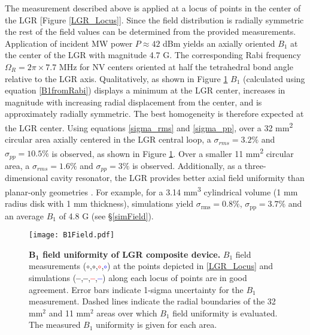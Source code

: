 The measurement described above is applied at a locus of points in the center of the LGR [Figure \ref{LGR_Locus}]. Since the field distribution is radially symmetric the rest of the field values can be determined from the provided measurements. Application of incident MW power $P \approx 42$ dBm yields an axially oriented $B_1$ at the center of the LGR with magnitude 4.7 G. The corresponding Rabi frequency $\Omega_R = 2\pi \times 7.7$ MHz for NV centers oriented at half the tetrahedral bond angle relative to the LGR axis. Qualitatively, as shown in Figure \ref{LGR_Field_Image} $B_1$ (calculated using equation \ref{B1fromRabi}) displays a minimum at the LGR center, increases in magnitude with increasing radial displacement from the center, and is approximately radially symmetric. The best homogeneity is therefore expected at the LGR center. Using equations \ref{sigma_rms} and \ref{sigma_pp}, over a 32 mm\textsuperscript{2} circular area axially centered in the LGR
central loop, a $\sigma_{rms} = 3.2\%$ and $\sigma_{pp} = 10.5\%$ is observed, as shown in Figure \ref{LGR_Field_Image}. Over a smaller 11 mm\textsuperscript{2} circular area, a $\sigma_{rms} = 1.6\%$ and $\sigma_{pp} = 3\%$ is observed. Additionally, as a three-dimensional cavity resonator, the LGR provides better axial field uniformity than planar-only geometries \cite{floch2016towards,kapitanova2017dielectric,angerer2016collective}. For example, for a 3.14 mm\textsuperscript{3} cylindrical volume (1 mm radius disk with 1 mm thickness), simulations yield $\sigma_{\text{rms}}=0.8\%$, $\sigma_{\text{pp}}=3.7\%$ and an average $B_1$ of 4.8 G (see \S \ref{simField}).


\begin{figure}[t!]
\centering
\texttt{[image: B1Field.pdf]}  
\caption{\textbf{$\boldsymbol{B_1}$ field uniformity of LGR composite device.} $B_1$ field measurements (\textcolor{deepmagenta}{$\circ$},\textcolor{black}{$\circ$},\textcolor{red}{$\circ$},\textcolor{blue}{$\circ$}) at the points depicted in \ref{LGR_Locus} and simulations (\textcolor{deepmagenta}{\textbf{--}},\textcolor{black}{\textbf{--}},\textcolor{red}{\textbf{--}},\textcolor{blue}{\textbf{--}}) along each locus of points are in good agreement. Error bars indicate 1-sigma uncertainty for the $B_1$ measurement. Dashed lines indicate the radial boundaries of the 32 mm$^2$ and 11 mm$^2$ areas over which $B_1$ field uniformity is evaluated. The measured $B_1$ uniformity is given for each area.}
\label{LGR_Field_Image}
\end{figure}



